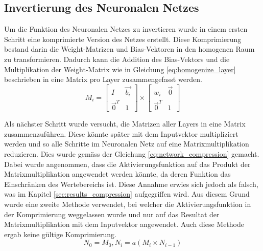 \documentclass[Interploate_hadwritten_Digits.tex]{subfiles}
\begin{document}
	\subsection{Invertierung des Neuronalen Netzes}
	\label{sec:method_compress}
	Um die Funktion des Neuronalen Netzes zu invertieren wurde in einem ersten Schritt eine komprimierte Version des Netzes erstellt. Diese Komprimierung bestand darin die Weight-Matrizen und Bias-Vektoren in den homogenen Raum zu transformieren. Dadurch kann die Addition des Bias-Vektors und die Multiplikation der Weight-Matrix wie in Gleichung \ref{eq:homogenize_layer} beschrieben in eine Matrix pro Layer zusammengefasst werden. 
	\begin{equation}
		M_{i} =
		\begin{bmatrix}
		I & \vec{b_{i}} \\ 
		\vec{0}^{T} & 1
		\end{bmatrix}
		\times
		\begin{bmatrix}
		w_{i} & \vec{0} \\ 
		\vec{0}^{T} & 1 
		\end{bmatrix}
		\label{eq:homogenize_layer}
	\end{equation}
	
	Als nächster Schritt wurde versucht, die Matrizen aller Layers in eine Matrix zusammenzuführen. Diese könnte später mit dem Inputvektor multipliziert werden und so alle Schritte im Neuronalen Netz auf eine Matrixmultiplikation reduzieren. Dies wurde gemäss der Gleichung \ref{eq:network_compression} gemacht. Dabei wurde angenommen, dass die Aktivierungsfunktion auf das Produkt der Matrixmultiplikation angewendet werden könnte, da deren Funktion das Einschränken des Wertebereichs ist. Diese Annahme erwies sich jedoch als falsch, was im Kapitel \ref{sec:results_compression} aufgegriffen wird. Aus diesem Grund wurde eine zweite Methode verwendet, bei welcher die Aktivierungsfunktion in der Komprimierung weggelassen wurde und nur auf das Resultat der Matrixmultiplikation mit dem Inputvektor angewendet.  Auch diese Methode ergab keine gültige Komprimierung.
	\begin{equation}
		N_{0} = M_{0},
		N_{i} = a(M_{i} \times N_{i - 1})
		\label{eq:network_compression}
	\end{equation}
	
\end{document}
